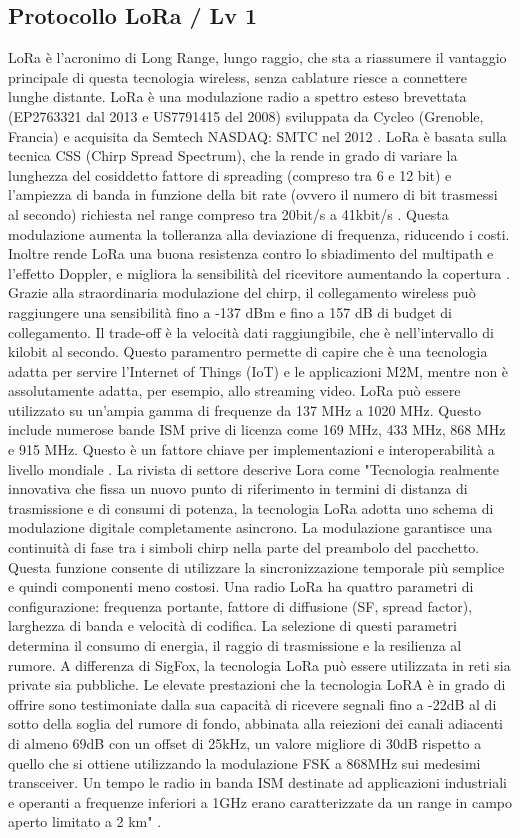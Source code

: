 \documentclass[a4paper]{report} %
\begin{document}
\subsection{Protocollo LoRa / Lv 1}
LoRa è l'acronimo di Long Range, lungo raggio, che sta a riassumere il vantaggio principale di questa tecnologia wireless, senza cablature riesce a connettere lunghe distante. LoRa è una modulazione radio a spettro esteso brevettata (EP2763321 dal 2013 e US7791415 del 2008) sviluppata da Cycleo (Grenoble, Francia) e acquisita da Semtech NASDAQ: SMTC nel 2012 \cite{art:rif.30}. 
LoRa è basata sulla tecnica CSS (Chirp Spread Spectrum), che la rende in grado di variare la lunghezza del cosiddetto fattore di spreading (compreso tra 6 e 12 bit) e l'ampiezza di banda in funzione della bit rate (ovvero il numero di bit trasmessi al secondo) richiesta nel range compreso tra 20bit/s a 41kbit/s \cite{art:rif.23}. 
Questa modulazione aumenta la tolleranza alla deviazione di frequenza, riducendo i costi. Inoltre rende LoRa una buona resistenza contro lo sbiadimento del multipath e l'effetto Doppler, e migliora la sensibilità del ricevitore aumentando la copertura \cite{art:rif.44}. 
Grazie alla straordinaria modulazione del chirp, il collegamento wireless può raggiungere una sensibilità fino a -137 dBm e fino a 157 dB di budget di collegamento. Il trade-off è la velocità dati raggiungibile, che è nell'intervallo di kilobit al secondo. Questo paramentro permette di capire che è una tecnologia adatta per servire l'Internet of Things (IoT) e le applicazioni M2M, mentre non è assolutamente adatta, per esempio, allo streaming video. LoRa può essere utilizzato su un'ampia gamma di frequenze da 137 MHz a 1020 MHz. Questo include numerose bande ISM prive di licenza come 169 MHz, 433 MHz, 868 MHz e 915 MHz. Questo è un fattore chiave per implementazioni e interoperabilità a livello mondiale \cite{art:rif.30}. 
La rivista di settore \cite{art:rif.23} descrive Lora come "Tecnologia realmente innovativa che fissa un nuovo punto di riferimento in termini di distanza di trasmissione e di consumi di potenza, la tecnologia LoRa adotta uno schema di modulazione digitale completamente asincrono. La modulazione garantisce una continuità di fase tra i simboli chirp nella parte del preambolo del pacchetto. Questa funzione consente di utilizzare la sincronizzazione temporale più semplice e quindi componenti meno costosi. Una radio LoRa ha quattro parametri di configurazione: frequenza portante, fattore di diffusione (SF, spread factor), larghezza di banda e velocità di codifica. La selezione di questi parametri determina il consumo di energia, il raggio di trasmissione e la resilienza al rumore. A differenza di SigFox, la tecnologia LoRa può essere utilizzata in reti sia private sia pubbliche. Le elevate prestazioni che la tecnologia LoRA è in grado di offrire sono testimoniate dalla sua capacità di ricevere segnali fino a -22dB al di sotto della soglia del rumore di fondo, abbinata alla reiezioni dei canali adiacenti di almeno 69dB con un offset di 25kHz, un valore migliore di 30dB rispetto a quello che si ottiene utilizzando la modulazione FSK a 868MHz sui medesimi transceiver. Un tempo le radio in banda ISM destinate ad applicazioni industriali e operanti a frequenze inferiori a 1GHz erano caratterizzate da un range in campo aperto limitato a 2 km" \cite{art:rif.23}. 
\end{document}
